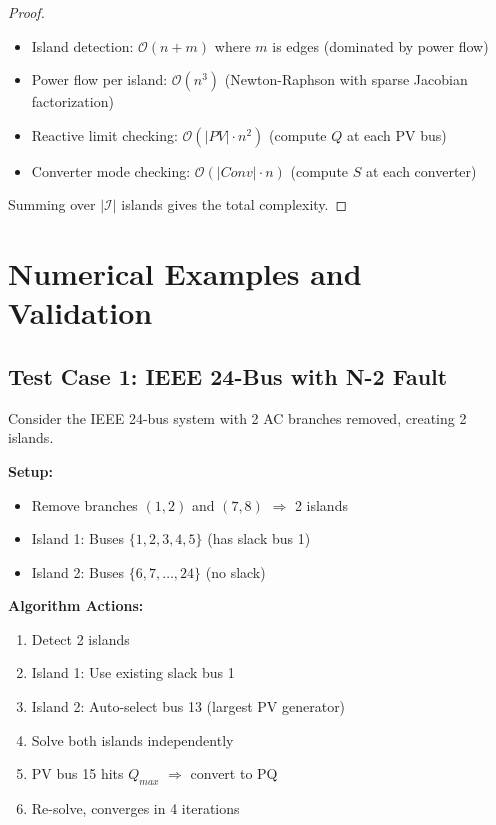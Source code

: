 \documentclass[11pt]{article}
\begin{document}
\begin{proof}
\begin{itemize}
    \item Island detection: $\mathcal{O}(n + m)$ where $m$ is edges (dominated by power flow)
    \item Power flow per island: $\mathcal{O}(n^3)$ (Newton-Raphson with sparse Jacobian factorization)
    \item Reactive limit checking: $\mathcal{O}(|PV| \cdot n^2)$ (compute $Q$ at each PV bus)
    \item Converter mode checking: $\mathcal{O}(|Conv| \cdot n)$ (compute $S$ at each converter)
\end{itemize}
Summing over $|\mathcal{I}|$ islands gives the total complexity.
\end{proof}

\section{Numerical Examples and Validation}

\subsection{Test Case 1: IEEE 24-Bus with N-2 Fault}

Consider the IEEE 24-bus system with 2 AC branches removed, creating 2 islands.

\textbf{Setup:}
\begin{itemize}
    \item Remove branches $(1,2)$ and $(7,8)$ $\Rightarrow$ 2 islands
    \item Island 1: Buses $\{1,2,3,4,5\}$ (has slack bus 1)
    \item Island 2: Buses $\{6,7,\ldots,24\}$ (no slack)
\end{itemize}

\textbf{Algorithm Actions:}
\begin{enumerate}
    \item Detect 2 islands
    \item Island 1: Use existing slack bus 1
    \item Island 2: Auto-select bus 13 (largest PV generator)
    \item Solve both islands independently
    \item PV bus 15 hits $Q_{max}$ $\Rightarrow$ convert to PQ
    \item Re-solve, converges in 4 iterations
\end{enumerate}
\end{document}
